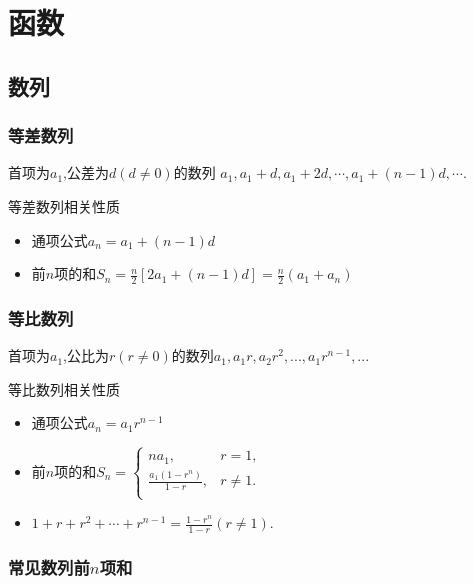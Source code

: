 \documentclass[12pt, a4paper, oneside, UTF8]{ctexbook}  %
\begin{document}
\begin{sloppypar}
    \else
    \fi
    \chapter{函数}
    \section{数列}
    \subsection{等差数列}
    首项为$a_1$,公差为$d(d \neq 0)$的数列 $a_1,a_1+d,a_1+2d,\cdots,a_1+(n-1)d,\cdots$.
    \begin{criterion}{等差数列相关性质}{}
        \begin{itemize}
            \item 通项公式$a_n=a_1+(n-1)d$
            \item 前$n$项的和$S_n=\frac{n}{2}[2a_1+(n-1)d]=\frac{n}{2}(a_1+a_n)$
        \end{itemize}
    \end{criterion}
    \subsection{等比数列}
    首项为$a_1$,公比为$r(r \neq 0)$的数列$a_1,a_1r,a_2r^2,...,a_1r^{n-1},...$
    \begin{criterion}{等比数列相关性质}{}
        \begin{itemize}
            \item 通项公式$a_n=a_1r^{n-1}$
            \item 前$n$项的和$S_{n}=\left\{\begin{matrix}{na_{1},}&{r=1,}\\{\frac{a_{1}\left(1-r^{n}\right)}{1-r},}&{r\neq1.}\\\end{matrix}\right.$
            \item $1+r+r^2+\cdots+r^{n-1}=\frac{1-r^n}{1-r}(r\neq1).$
        \end{itemize}
    \end{criterion}
    \subsection{常见数列前$n$项和}
    \begin{center}
    \end{center}

\end{sloppypar}
\end{document}
